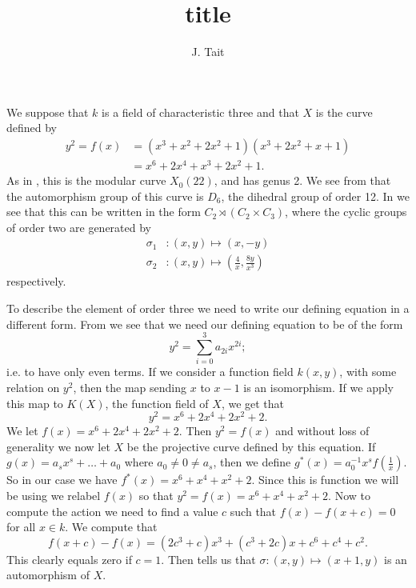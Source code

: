 \documentclass[draft, 11pt]{article} %
\title{title}
\author{J. Tait}
\theoremstyle{plain}
\theoremstyle{remark}
\begin{document}
\maketitle

We suppose that $k$ is a field of characteristic three and that $X$ is the curve defined by
\begin{align*}
y^2 = f(x)  & = (x^3 + x^2 + 2x^2 + 1)(x^3 + 2x^2 + x + 1)\\
& = x^6 + 2x^4 + x^3 + 2x^2 + 1.
\end{align*}
As in \cite[Table 2]{automorphismshyperellipticmodular}, this is the modular curve $X_0(22)$, and has genus 2.
We see from \cite[Table 1]{automorphismshyperellipticmodular} that the automorphism group of this curve is $D_6$, the dihedral group of order 12.
In \cite[\S 3.3]{automorphismshyperellipticmodular} we see that this can be written in the form $C_2 \rtimes (C_2 \times C_3)$, where the cyclic groups of order two are generated by
\begin{align*}
\sigma_1 & \colon (x,y) \mapsto (x,-y) \\
\sigma_2 & \colon (x,y) \mapsto \left( \frac{4}{x}, \frac{8y}{x^3} \right)
\end{align*}
respectively.

To describe the element of order three we need to write our defining equation in a different form.
From \cite[\S 3.3]{automorphismshyperellipticmodular} we see that we need our defining equation to be of the form 
\[
y^2 = \sum_{i=0}^3 a_{2i}x^{2i};
\]
i.e. to have only even terms.
If we consider a function field $k(x,y)$, with some relation on $y^2$, then the map sending $x$ to $x-1$ is an isomorphism.
If we apply this map to $K(X)$, the function field of $X$, we get that
\[
y^2 = x^6 + 2x^4 + 2x^2 + 2.
\]
We let $f(x) = x^6 + 2x^4 + 2x^2 + 2$.
Then $y^2 = f(x)$ and without loss of generality we now let $X$ be the projective curve defined by this equation.
If $g(x) = a_sx^s + \ldots + a_0$ where $a_0 \neq 0 \neq a_s$, then we define $g^*(x) = a_0^{-1}x^sf\left( \frac{1}{x} \right)$.
So in our case we have $f^*(x) = x^6  + x^4 + x^2 + 2$.
Since this is function we will be using we relabel $f(x)$ so that $y^2 = f(x) = x^6 + x^4 + x^2 + 2$.
Now to compute the action we need to find a value $c$ such that $f(x) - f(x+c) = 0$ for all $x \in k$.
We compute that
\[
f(x+c) - f(x) = (2c^3+c)x^3 + (c^3 + 2c)x + c^6 + c^4 + c^2.
\]
This clearly equals zero if $c=1$.
Then \cite[\S 3.3]{automorphismshyperellipticmodular} tells us that $\sigma \colon (x,y) \mapsto (x+1, y)$ is an automorphism of $X$.
\end{document}
